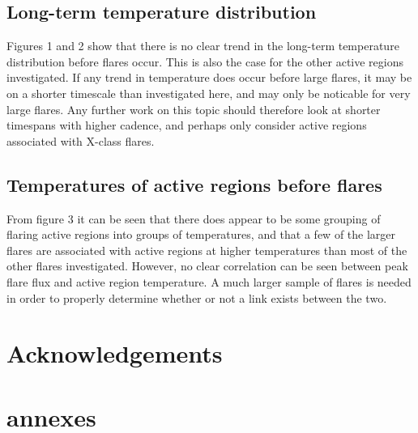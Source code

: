 \documentclass[referee,a4paper,12pt,traditabstract]{swsc}
\begin{document}
\begin{linenumbers}
\subsection{Long-term temperature distribution}
Figures 1 and 2 show that there is no clear trend in the long-term temperature distribution before flares occur.
This is also the case for the other active regions investigated. If any trend in temperature does occur before large flares, it may be on a shorter timescale than investigated here, and may only be noticable for very large flares.
Any further work on this topic should therefore look at shorter timespans with higher cadence, and perhaps only consider active regions associated with X-class flares.

\subsection{Temperatures of active regions before flares}
From figure 3 it can be seen that there does appear to be some grouping of flaring active regions into groups of temperatures, and that a few of the larger flares are associated with active regions at higher temperatures than most of the other flares investigated.
However, no clear correlation can be seen between peak flare flux and active region temperature.
A much larger sample of flares is needed in order to properly determine whether or not a link exists between the two.

\section*{Acknowledgements}

\section*{annexes}




\end{linenumbers}
\end{document}
